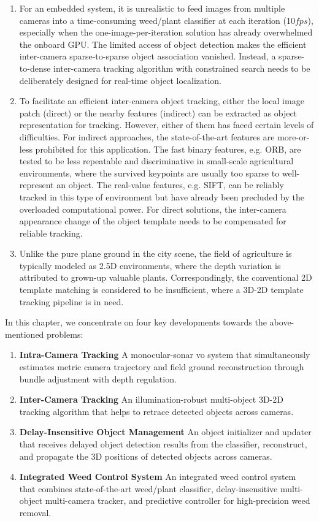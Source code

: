 \begin{enumerate}
	\item For an embedded system, it is unrealistic to feed images from multiple cameras into a time-consuming weed/plant classifier at each iteration (10$fps$), especially when the one-image-per-iteration solution has already overwhelmed the onboard GPU. 
The limited access of object detection makes the efficient inter-camera sparse-to-sparse object association vanished. 
Instead, a sparse-to-dense inter-camera tracking algorithm with constrained search needs to be deliberately designed for real-time object localization. 
	\item To facilitate an efficient inter-camera object tracking, either the local image patch (direct) or the nearby features (indirect) can be extracted as object representation for tracking. 
However, either of them has faced certain levels of difficulties. 
For indirect approaches, the state-of-the-art features are more-or-less prohibited for this application. 
The fast binary features, e.g. ORB, are tested to be less repeatable and discriminative in small-scale agricultural environments, where the survived keypoints are usually too sparse to well-represent an object. 
The real-value features, e.g. SIFT, can be reliably tracked in this type of environment but have already been precluded by the overloaded computational power. 
For direct solutions, the inter-camera appearance change of the object template needs to be compensated for reliable tracking. 
	\item Unlike the pure plane ground in the city scene, the field of agriculture is typically modeled as 2.5D environments, where the depth variation is attributed to grown-up valuable plants.
Correspondingly, the conventional 2D template matching is considered to be insufficient, where a 3D-2D template tracking pipeline is in need.
\end{enumerate}

In this chapter, we concentrate on four key developments towards the above-mentioned problems: 
\begin{enumerate}
	\item \textbf{Intra-Camera Tracking} A monocular-sonar \acrshort{vo} system that simultaneously estimates metric camera trajectory and field ground reconstruction through bundle adjustment with depth regulation.
	\item \textbf{Inter-Camera Tracking} An illumination-robust multi-object 3D-2D tracking algorithm that helps to retrace detected objects across cameras. 
	\item \textbf{Delay-Insensitive Object Management} An object initializer and updater that receives delayed object detection results from the classifier, reconstruct, and propagate the 3D positions of detected objects across cameras.
	\item \textbf{Integrated Weed Control System} An integrated weed control system that combines state-of-the-art weed/plant classifier, delay-insensitive multi-object multi-camera tracker, and predictive controller for high-precision weed removal.
\end{enumerate}

